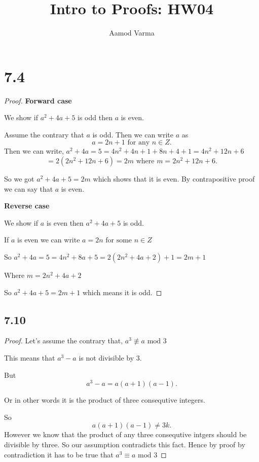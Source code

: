 \documentclass[a4paper]{report}
\title{Intro to Proofs: HW04}
\author{Aamod Varma}
\begin{document}
\maketitle
\date{}
    
\section*{7.4}
\begin{proof}
    \textbf{Forward case}

    We show if $a^2 + 4a + 5$ is odd then  $a$ is even.

    Assume the contrary that $a$ is odd. Then we can write  $a$ as \[
        a = 2n + 1 \text{ for any } n \in Z
    .\] 
    Then we can write, $a ^2 + 4a = 5 = 4n^2 + 4n + 1 + 8n + 4 + 1 = 4n^2 + 12n + 6$
    \[
        = 2(2n^2 + 12n + 6) = 2m \text{ where $m = 2n^2 + 12n + 6$}
    .\] 

    So we got $a ^2 + 4a +5  = 2m$  which shows that it is even. By contrapositive proof we can say that $a$ is even.


    \textbf{Reverse case}

    We show if $a$ is even then $a^2 + 4a + 5$ is odd.
    
    If $a$ is even we can write $a = 2n \text{ for some } n \in Z$

    So  $a^2 + 4a = 5 = 4n^2 + 8a + 5 = 2(2n^2 + 4a + 2) + 1 = 2m + 1$

    Where $m = 2n^2 + 4a +2$

    So $a^2 + 4a + 5 = 2m + 1$ which means it is odd.


\end{proof}
\subsection*{7.10}
\begin{proof}
    Let's assume the contrary that, $a^3 \not \equiv a \text{ mod 3}$

    This means that $a^3 - a$ is not divisible by $3$.

    But  \[
    a^3 - a = a ( a + 1)(a  - 1)
    .\] 

    Or in other words it is the product of three consequtive integers.

    So \[
    a(a+1)(a-1) \neq 3k
    .\] 
    However we know that the product of any three consequtive intgers should be divisible by three. So our assumption contradicts this fact. Hence by proof by contradiction it has to be true that $a^3 \equiv a \text{ mod 3}$
\end{proof}
\end{document}
